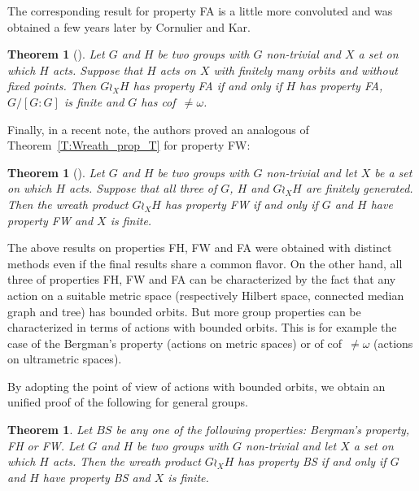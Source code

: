 \documentclass[a4paper]{article}
\newtheorem{thm}[lem]{Theorem}
\theoremstyle{definition}
\begin{document}
The corresponding result for property FA is a little more convoluted and was obtained a few years later by Cornulier and Kar.
%
%
\begin{thm}[\cite{Cornulier2011}]\label{Thm:FACK}
Let $G$ and $H$ be two groups with $G$ non-trivial and $X$ a set on which $H$ acts. Suppose that $H$ acts on $X$ with finitely many orbits and without fixed points.
Then $G\wr_XH$ has property FA if and only if $H$ has property FA, $G/[G:G]$ is finite and $G$ has cof~$\neq\omega$.
\end{thm}
%
%
Finally, in a recent note, the authors proved an analogous of Theorem~\ref{T:Wreath_prop_T} for property FW:
%
%
\begin{thm}[\cite{LS2020}]\label{Thm:PropFW}
Let $G$ and $H$ be two groups with $G$ non-trivial and let $X$ be a set on which $H$ acts. Suppose that all three of $G$, $H$ and $G\wr_XH$ are finitely generated. Then the wreath product $G \wr_X H$ has property FW if and only if $G$ and $H$ have property FW and $X$ is finite.
\end{thm}
%
%
The above results on properties FH, FW and FA were obtained with distinct methods even if the final results share a common flavor.
On the other hand, all three of properties FH, FW and FA can be characterized by the fact that any action on a suitable metric space (respectively Hilbert space, connected median graph and tree) has bounded orbits.
But more group properties can be characterized in terms of actions with bounded orbits. This is for example the case of the Bergman's property (actions on metric spaces) or of cof~$\neq\omega$ (actions on ultrametric spaces).

By adopting the point of view of actions with bounded orbits, we obtain an unified proof of the following for general groups.
%
%
\begin{thm}\label{Thm:Main}
Let $BS$ be any one of the following properties: Bergman's property, FH or FW.
Let $G$ and $H$ be two groups with $G$ non-trivial and let $X$ a set on which $H$ acts. Then the wreath product $G \wr_X H$ has property BS if and only if $G$ and $H$ have property BS and $X$ is finite.
\end{thm}
\end{document}
